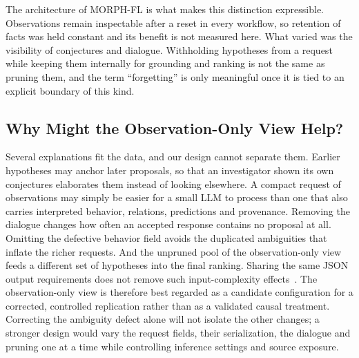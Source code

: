 \documentclass[a4paper,fleqn]{cas-sc}
\newcommand{\tool}{MORPH-FL}
\begin{document}
The architecture of \tool{} is what makes this distinction expressible. Observations remain inspectable after a reset in every workflow, so retention of facts was held constant and its benefit is not measured here. What varied was the visibility of conjectures and dialogue. Withholding hypotheses from a request while keeping them internally for grounding and ranking is not the same as pruning them, and the term ``forgetting'' is only meaningful once it is tied to an explicit boundary of this kind.

\subsection{Why Might the Observation-Only View Help?}
Several explanations fit the data, and our design cannot separate them. Earlier hypotheses may anchor later proposals, so that an investigator shown its own conjectures elaborates them instead of looking elsewhere. A compact request of observations may simply be easier for a small LLM to process than one that also carries interpreted behavior, relations, predictions and provenance. Removing the dialogue changes how often an accepted response contains no proposal at all. Omitting the defective behavior field avoids the duplicated ambiguities that inflate the richer requests. And the unpruned pool of the observation-only view feeds a different set of hypotheses into the final ranking. Sharing the same JSON output requirements does not remove such input-complexity effects~\citep{formatrestrict2024}. The observation-only view is therefore best regarded as a candidate configuration for a corrected, controlled replication rather than as a validated causal treatment. Correcting the ambiguity defect alone will not isolate the other changes; a stronger design would vary the request fields, their serialization, the dialogue and pruning one at a time while controlling inference settings and source exposure.
\end{document}
